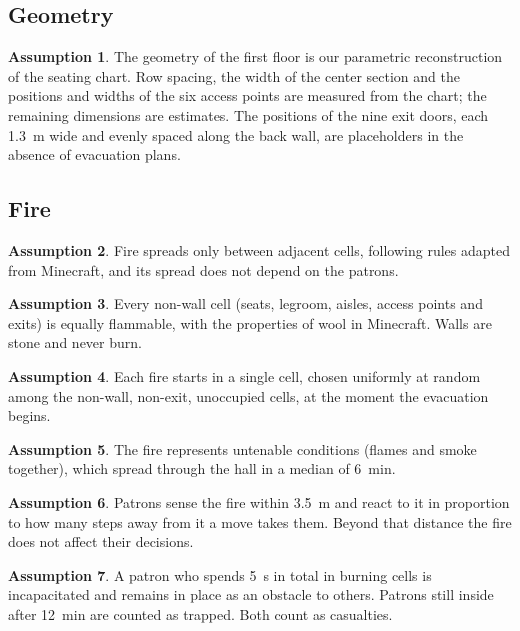 \documentclass[14pt]{article}
\theoremstyle{definition}
\newtheorem{assumption}{Assumption}
\begin{document}
\subsection{Geometry}
\begin{assumption}\label{as:geometry}
  The geometry of the first floor is our parametric reconstruction of the seating chart. Row spacing, the width of the center section and the positions and widths of the six access points are measured from the chart; the remaining dimensions are estimates. The positions of the nine exit doors, each \SI{1.3}{m} wide and evenly spaced along the back wall, are placeholders in the absence of evacuation plans.
\end{assumption}

\subsection{Fire}
\begin{assumption}\label{as:firespread}
  Fire spreads only between adjacent cells, following rules adapted from Minecraft, and its spread does not depend on the patrons.
\end{assumption}
\begin{assumption}\label{as:flammable}
  Every non-wall cell (seats, legroom, aisles, access points and exits) is equally flammable, with the properties of wool in Minecraft. Walls are stone and never burn.
\end{assumption}
\begin{assumption}\label{as:ignition}
  Each fire starts in a single cell, chosen uniformly at random among the non-wall, non-exit, unoccupied cells, at the moment the evacuation begins.
\end{assumption}
\begin{assumption}\label{as:untenable}
  The fire represents untenable conditions (flames and smoke together), which spread through the hall in a median of \SI{6}{min}.
\end{assumption}
\begin{assumption}\label{as:sensing}
  Patrons sense the fire within \SI{3.5}{m} and react to it in proportion to how many steps away from it a move takes them. Beyond that distance the fire does not affect their decisions.
\end{assumption}
\begin{assumption}\label{as:exposure}
  A patron who spends \SI{5}{s} in total in burning cells is incapacitated and remains in place as an obstacle to others. Patrons still inside after \SI{12}{min} are counted as trapped. Both count as casualties.
\end{assumption}
\end{document}
